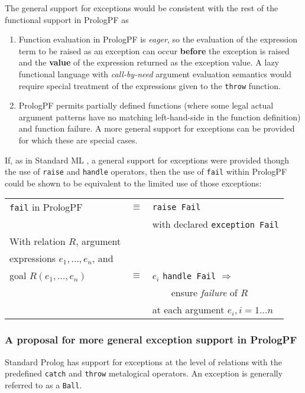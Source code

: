 The general support for exceptions would be consistent with the rest of the
functional support in PrologPF as
\begin{enumerate}
\item{Function evaluation in PrologPF is \textit{eager}, so 
  the evaluation of the expression term to be raised as an
  exception can occur \textbf{before} the exception is raised
  and the \textbf{value} of the expression returned as the
  exception value.  A lazy functional language with 
  \textit{call-by-need} argument evaluation semantics would require
  special treatment of the expressions given to the \texttt{throw}
  function.}
\item{PrologPF permits partially defined functions (where some
  legal actual argument patterns have no matching left-hand-side in
  the function definition) and function failure.
  A more general support for exceptions can be provided for
  which these are special cases.
  }
\end{enumerate}

If, as in Standard ML \cite{MTH90}, a general support for
exceptions were provided though the use of \texttt{raise} and
\texttt{handle} operators, then the use of \texttt{fail} within
PrologPF could be shown to be equivalent to the limited use of 
those exceptions:\\
\begin{tabular}{l l l}
\texttt{fail} in PrologPF      &$\equiv$ &\texttt{raise Fail}\\
                               &         &with declared \texttt{exception Fail}\\[4mm]
With relation $R$, argument    &         &\\
expressions $e_1,...,e_n$, and &         & \\
goal $R(e_1,\ldots,e_n)$       &$\equiv$ &$e_i$ \texttt{handle Fail} $\Rightarrow$\\
                               &         &~~~~ensure \textit{failure} of $R$\\
                               &         &at each argument $e_i, i=1\ldots n$\\
\end{tabular}

\subsubsection{A proposal for more general exception support in PrologPF}

Standard Prolog \cite{DEDC96} has support for exceptions at the
level of relations with the predefined \texttt{catch} and \texttt{throw}
metalogical operators.  An exception is generally referred to as a 
\texttt{Ball}.

